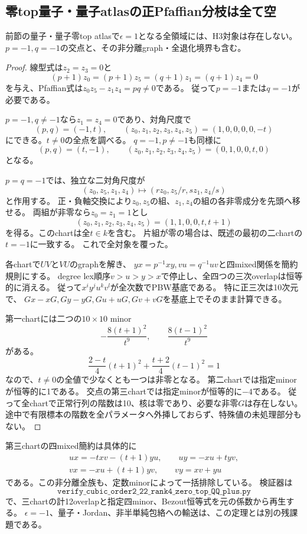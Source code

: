 \subsection{零top量子・量子atlasの正Pfaffian分枝は全て空}
\label{subsec:h3-order2-22-rank4-zero-top-QQ-plus}
\begin{theorem}\label{thm:h3-order2-22-rank4-zero-top-QQ-plus-empty}
前節の量子・量子零top atlasで$\epsilon=1$となる全領域には、H3対象は存在しない。
$p=-1,q=-1$の交点と、その非分離graph・全退化境界も含む。
\end{theorem}
\begin{proof}
線型式は$z_2=z_3=0$と
\[
 (p+1)z_0=(p+1)z_5=(q+1)z_1=(q+1)z_4=0
\]
を与え、Pfaffian式は$z_0z_5-z_1z_4=pq\ne0$である。
従って$p=-1$または$q=-1$が必要である。

$p=-1,q\ne-1$なら$z_1=z_4=0$であり、対角尺度で
\[
 (p,q)=(-1,t),\qquad(z_0,z_1,z_2,z_3,z_4,z_5)=(1,0,0,0,0,-t)
\]
にできる。$t\ne0$の全点を調べる。
$q=-1,p\ne-1$も同様に
\[
 (p,q)=(t,-1),\qquad(z_0,z_1,z_2,z_3,z_4,z_5)=(0,1,0,0,t,0)
\]
となる。

$p=q=-1$では、独立な二対角尺度が
\[
 (z_0,z_5,z_1,z_4)\longmapsto
 (r z_0,z_5/r,s z_1,z_4/s)
\]
と作用する。
正・負軸交換により$z_0,z_5$の組、$z_1,z_4$の組の各非零成分を先頭へ移せる。
両組が非零なら$z_0=z_1=1$とし
\[
 (z_0,z_1,z_2,z_3,z_4,z_5)=(1,1,0,0,t,t+1)
\]
を得る。このchartは全$t\in k$を含む。
片組が零の場合は、既述の最初の二chartの$t=-1$に一致する。
これで全対象を覆った。

各chartで$UV$と$VU$のgraphを解き、
$yx=p^{-1}xy,vu=q^{-1}uv$と四mixed関係を簡約規則にする。
degree lex順序$v>u>y>x$で停止し、全四つの三次overlapは恒等的に消える。
従って$x^iy^ju^kv^l$が全次数でPBW基底である。
特に正三次は10次元で、
$Gx-xG,Gy-yG,Gu+uG,Gv+vG$を基底上でそのまま計算できる。

第一chartには二つの$10\times10$ minor
\[
 -\frac{8(t+1)^2}{t^9},\qquad\frac{8(t-1)^2}{t^9}
\]
がある。
\[
 \frac{2-t}{4}(t+1)^2+\frac{t+2}{4}(t-1)^2=1
\]
なので、$t\ne0$の全値で少なくとも一つは非零となる。
第二chartでは指定minorが恒等的に1である。
交点の第三chartでは指定minorが恒等的に$-4$である。
従って全chartで正常行列の階数は10、核は零であり、必要な非零$G$は存在しない。
途中で有限標本の階数を全パラメータへ外挿しておらず、特殊値の未処理部分もない。
\end{proof}

第三chartの四mixed簡約は具体的に
\begin{gather*}
 ux=-t xv-(t+1)yu,\qquad uy=-xu+t yv,\\
 vx=-xu+(t+1)yv,\qquad vy=xv+yu
\end{gather*}
である。この非分離全族も、定数minorによって一括排除している。
検証器は
\[
 \texttt{verify\_cubic\_order2\_22\_rank4\_zero\_top\_QQ\_plus.py}
\]
で、三chartの計12overlapと指定四minor、Bezout恒等式を元の係数から再生する。
$\epsilon=-1$、量子・Jordan、非半単純包絡への輸送は、この定理とは別の残課題である。

